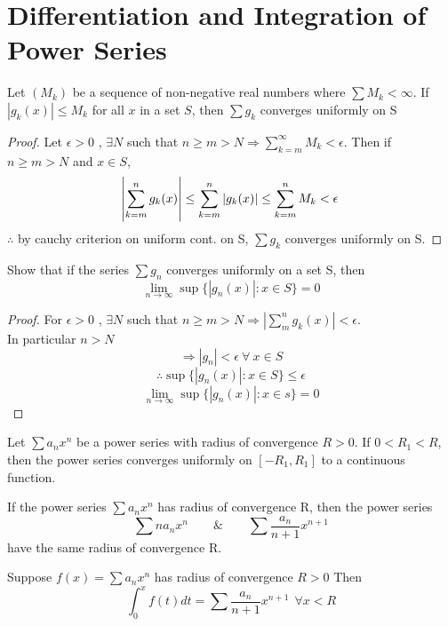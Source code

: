 \documentclass{notes}
\begin{document}
\chapter{Differentiation and Integration of Power Series}
\begin{theorem}{}
	Let $(M_k)$ be a sequence of non-negative real numbers where $\sum M_k < \infty$. If $|g_k(x)| \leq M_k$ for all $x$ in a set $S$, then $\sum g_k$ converges
	uniformly on S
\end{theorem}
\begin{proof}
	Let $\epsilon>0$ , $\exists N $ such that $n \geq m > N \Rightarrow \sum_{k = m}^{\infty} M_k < \epsilon$. Then if $ n \geq m > N $ and $  x \in S $,
	$$\abs{\sum_{k = m}^{n}g_k(x)} \leq\sum_{k = m}^{n}|g_k(x)| \leq \sum_{k = m}^{n}M_k < \epsilon $$
	$ \therefore $ by cauchy criterion on uniform cont. on S,
	$ \sum g_k $ converges uniformly on S.
\end{proof}
\begin{problem}
	Show that if the series $ \sum g_n $  converges uniformly on a set S, then
	$$\lim\limits_{n \to \infty} \sup\{|g_n(x)|: x\in S\} = 0 $$
\end{problem}
\begin{proof}
	For $\epsilon > 0$ , $\exists N$ such that $n \geq m > N \Rightarrow \left| \sum_{m}^{n} g_k (x)\right| < \epsilon$.\\
	In particular $n>N$ 
	$$\Rightarrow |g_n| < \epsilon\ \forall \ x \in S $$
	$$\therefore \sup \{|g_n(x)| : x \in S \} \leq \epsilon$$
	$$\lim_{n \to \infty }\sup \{|g_n(x)|: x\in s\} = 0$$
\end{proof}


\begin{theorem}{}
	Let $ \sum a_n x^n  $ be a power series with radius of convergence $R > 0$. If $0 < R_1 < R$, then the power series converges
	uniformly on $[-R_1, R_1]$ to a continuous function.
\end{theorem}

\begin{lemma}
	If the power series $ \sum a_n x^n  $  has radius of convergence R, then the
	power series
	$$\sum n a_n x^n \qquad \& \qquad \sum \dfrac{a_n}{n+1} x^{n+1}$$
	have the same radius of convergence R.
\end{lemma}

\begin{theorem}{}
	Suppose $f(x) =  \sum a_n x^n  $ has radius of convergence $R > 0$ Then
	$$\int_{0}^{x}f(t) dt = \sum \frac{a_n}{n+1}x^{n+1}\ \ \forall x < R$$
\end{theorem}
\end{document}

